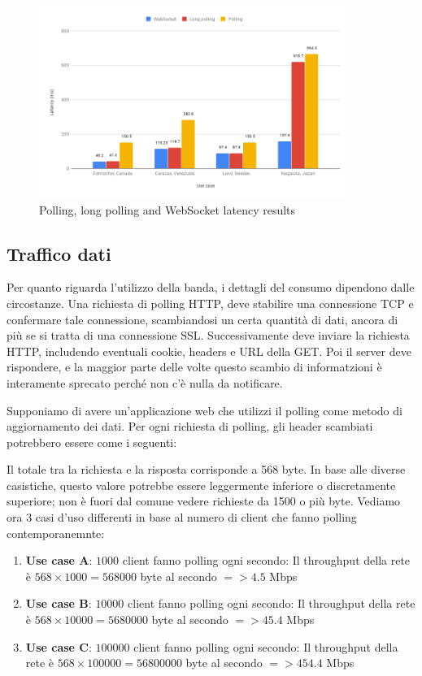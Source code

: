 \documentclass[12pt,a4paper,openright,twoside]{report}
\begin{document}
\begin{figure}[htbp]
\centering
\includegraphics[width=0.9\textwidth]{assets/latency_chart.png}
\caption{Polling, long polling and WebSocket latency results}
\label{fig:latency_chart}
\end{figure}

\subsection{Traffico dati}

Per quanto riguarda l'utilizzo della banda, i dettagli del consumo dipendono dalle circostanze. Una richiesta di polling HTTP, deve stabilire una connessione TCP e confermare tale connessione, scambiandosi un certa quantità di dati, ancora di più se si tratta di una connessione SSL. Successivamente deve inviare la richiesta HTTP, includendo eventuali cookie, headers e URL della GET. Poi il server deve rispondere, e la maggior parte delle volte questo scambio di informatzioni è interamente sprecato perché non c'è nulla da notificare.

\bigskip

Supponiamo di avere un'applicazione web che utilizzi il polling come metodo di aggiornamento dei dati. Per ogni richiesta di polling, gli header scambiati potrebbero essere come i seguenti:

Il totale tra la richiesta e la risposta corrisponde a 568 byte. In base alle diverse casistiche, questo valore potrebbe essere leggermente inferiore o discretamente superiore; non è fuori dal comune vedere richieste da 1500 o più byte.
Vediamo ora 3 casi d'uso differenti in base al numero di client che fanno polling contemporanemnte:
\begin{enumerate}
\item \textbf{Use case A}: $1000$ client fanno polling ogni secondo: Il throughput della rete è $568 \times 1000 = 568000$ byte al secondo $=> 4.5$ Mbps
\item \textbf{Use case B}: $10000$ client fanno polling ogni secondo: Il throughput della rete è $568 \times 10000 = 5680000$ byte al secondo $=> 45.4$ Mbps
\item \textbf{Use case C}: $100000$ client fanno polling ogni secondo: Il throughput della rete è $568 \times 100000 = 56800000$ byte al secondo $=> 454.4$ Mbps
\end{enumerate}
\end{document}
